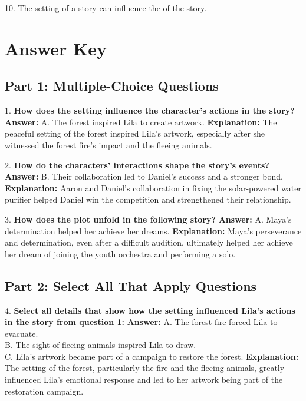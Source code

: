 \documentclass[12pt]{article}
\begin{document}
10. The setting of a story can influence the \underline{\hspace{4cm}} of the story.  
\vspace{2cm}
\newpage
\section*{Answer Key}

\subsection*{Part 1: Multiple-Choice Questions}

1. \textbf{How does the setting influence the character’s actions in the story?}  
\textbf{Answer:} A. The forest inspired Lila to create artwork.  
\textbf{Explanation:} The peaceful setting of the forest inspired Lila’s artwork, especially after she witnessed the forest fire’s impact and the fleeing animals.

\vspace{1cm}
2. \textbf{How do the characters' interactions shape the story’s events?}  
\textbf{Answer:} B. Their collaboration led to Daniel’s success and a stronger bond.  
\textbf{Explanation:} Aaron and Daniel’s collaboration in fixing the solar-powered water purifier helped Daniel win the competition and strengthened their relationship.

\vspace{1cm}
3. \textbf{How does the plot unfold in the following story?}  
\textbf{Answer:} A. Maya’s determination helped her achieve her dreams.  
\textbf{Explanation:} Maya’s perseverance and determination, even after a difficult audition, ultimately helped her achieve her dream of joining the youth orchestra and performing a solo.

\subsection*{Part 2: Select All That Apply Questions}

4. \textbf{Select all details that show how the setting influenced Lila’s actions in the story from question 1:}  
\textbf{Answer:} A. The forest fire forced Lila to evacuate. \\
B. The sight of fleeing animals inspired Lila to draw. \\
C. Lila’s artwork became part of a campaign to restore the forest.  
\textbf{Explanation:} The setting of the forest, particularly the fire and the fleeing animals, greatly influenced Lila’s emotional response and led to her artwork being part of the restoration campaign.
\end{document}
